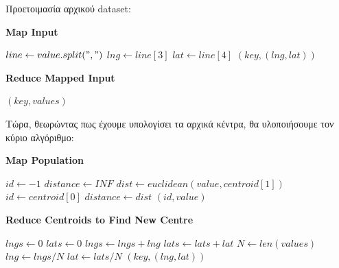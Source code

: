 \documentclass{ntua}
\begin{document}
Προετοιμασία αρχικού dataset:
\begin{algorithm}[H]
\caption*{\bfseries{Map Input}}
\begin{algorithmic}[1]
	\State $line \gets value.split(",")$
	\State $lng \gets line[3]$
	\State $lat \gets line[4]$
	\Emit $(key, (lng, lat))$
	\EndFunction
\end{algorithmic}
\end{algorithm}

\begin{algorithm}[H]
\caption*{\bfseries{Reduce Mapped Input}}
\begin{algorithmic}[1]
	\Emit $(key, values)$
	\EndFunction
\end{algorithmic}
\end{algorithm}

\noindent
Τώρα, θεωρώντας πως έχουμε υπολογίσει τα αρχικά κέντρα, θα υλοποιήσουμε τον κύριο αλγόριθμο:

\begin{algorithm}[H]
\caption*{\bfseries{Map Population}}
\begin{algorithmic}[1]
	\State $id \gets -1$
	\State $distance \gets INF$
		\State $dist \gets euclidean(value, centroid[1])$
			\State $id \gets centroid[0]$
			\State $distance \gets dist$
		\EndIf
	\EndFor
	\Emit $(id, value)$
	\EndFunction
\end{algorithmic}
\end{algorithm}

\begin{algorithm}[H]
\caption*{\bfseries{Reduce Centroids to Find New Centre}}
\begin{algorithmic}[1]
	\State $lngs \gets 0$
	\State $lats \gets 0$
		\State $lngs \gets lngs + lng$
		\State $lats \gets lats + lat$
	\EndFor
	\State $N \gets len(values)$
	\State $lng \gets lngs / N$
	\State $lat \gets lats / N$
	\Emit $(key, (lng, lat))$
	\EndFunction
\end{algorithmic}
\end{algorithm}
\end{document}
